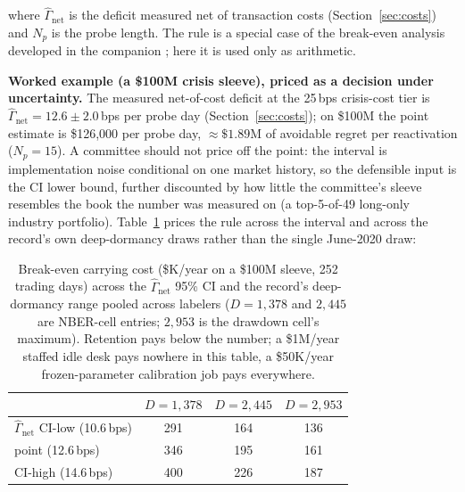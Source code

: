 \documentclass[sigconf,anonymous]{acmart}
\newcommand{\G}{\hat\Gamma}
\begin{document}
\begin{center}
\fbox{\parbox{0.88\columnwidth}{\centering
\vspace{2pt}
$c \cdot D \;\le\; \G_{\mathrm{net}} \cdot N_p \cdot V$
\vspace{2pt}
}}
\end{center}

\noindent where $\G_{\mathrm{net}}$ is the deficit measured net of
transaction costs (Section~\ref{sec:costs}) and $N_p$ is the probe
length. The rule is a special case of the break-even analysis developed
in the companion \cite{companion2026}; here it is used only as
arithmetic.

\textbf{Worked example (a \$100M crisis sleeve), priced as a decision
under uncertainty.} The measured net-of-cost deficit at the 25\,bps
crisis-cost tier is $\G_{\mathrm{net}} = 12.6 \pm 2.0$\,bps per probe
day (Section~\ref{sec:costs}); on \$100M the point estimate is
\$126{,}000 per probe day, ${\approx}\$1.89$M of avoidable regret per
reactivation ($N_p = 15$). A committee should not price off the point:
the interval is implementation noise conditional on one market
history, so the defensible input is the CI lower bound, further
discounted by how little the committee's sleeve resembles the book the
number was measured on (a top-5-of-49 long-only industry portfolio).
Table~\ref{tab:breakeven} prices the rule across the interval and
across the record's own deep-dormancy draws rather than the single
June-2020 draw:

\begin{table}[h]
\centering
\caption{Break-even carrying cost (\$K/year on a \$100M sleeve,
252 trading days) across the $\G_{\mathrm{net}}$ 95\% CI and the
record's deep-dormancy range pooled across labelers ($D{=}1{,}378$
and $2{,}445$ are NBER-cell entries; $2{,}953$ is the drawdown cell's
maximum). Retention pays below the number; a
\$1M/year staffed idle desk pays nowhere in this table, a \$50K/year
frozen-parameter calibration job pays everywhere.}
\label{tab:breakeven}
\small
\begin{tabular}{@{}lccc@{}}
\toprule
 & $D{=}1{,}378$ & $D{=}2{,}445$ & $D{=}2{,}953$ \\
\midrule
$\G_{\mathrm{net}}$ CI-low (10.6\,bps) & 291 & 164 & 136 \\
point (12.6\,bps) & 346 & 195 & 161 \\
CI-high (14.6\,bps) & 400 & 226 & 187 \\
\bottomrule
\end{tabular}
\end{table}
\end{document}
